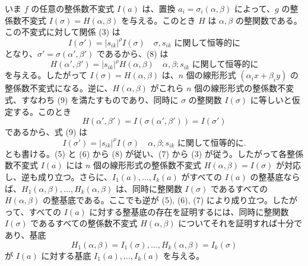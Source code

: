 \documentclass[11pt]{article}
\begin{document}
いま \(f\) の任意の整係数不変式 \(I(a)\) は、置換 \(a_i=\sigma_i(\alpha,\beta)\) によって、\(g\) の整係数不変式 \(I(\sigma)=H(\alpha,\beta)\) を与える。このとき \(H\) は \(\alpha,\beta\) の整関数である。この不変式に対して関係 (3) は
\begin{equation}
        I(\sigma')=|s_{ik}|^\rho I(\sigma)
        \quad \text{\(\sigma,s_{ik}\) に関して恒等的に}
\end{equation}
となり、\(\sigma'=\sigma(\alpha',\beta')\) であるから、(8) は
\begin{equation}
        H(\alpha',\beta')=|s_{ik}|^\rho H(\alpha,\beta)
        \quad \text{\(\alpha,\beta;s_{ik}\) に関して恒等的に}
\end{equation}
を与える。したがって \(I(\sigma)=H(\alpha,\beta)\) は、\(n\) 個の線形形式 \((\alpha_i x+\beta_i y)\) の整係数不変式になる。逆に、\(H(\alpha,\beta)\) がこれら \(n\) 個の線形形式の整係数不変式、すなわち (9) を満たすものであり、同時に \(\sigma\) の整関数 \(I(\sigma)\) に等しいと仮定する。このとき
\[
        H(\alpha',\beta')=I(\sigma(\alpha',\beta'))=I(\sigma')
\]
であるから、式 (9) は
\begin{equation*}
        I(\sigma')=|s_{ik}|^\rho I(\sigma)
        \quad \text{\(\alpha,\beta;s_{ik}\) に関して恒等的に}.\tag{9a}
\end{equation*}
とも書ける。(5) と (6) から (8) が従い、(7) から (3) が従う。したがって各整係数不変式 \(I(a)\) には \(n\) 個の線形形式の整係数不変式 \(H(\alpha,\beta)=I(\sigma)\) が対応し、逆も成り立つ。さらに、\(I_1(a),\ldots,I_k(a)\) がすべての \(I(a)\) の整基底ならば、\(H_1(\alpha,\beta),\ldots,H_k(\alpha,\beta)\) は、同時に整関数 \(I(\sigma)\) であるすべての \(H(\alpha,\beta)\) の整基底である。ここでも逆が (5), (6), (7) により成り立つ。したがって、すべての \(I(a)\) に対する整基底の存在を証明するには、同時に整関数 \(I(\sigma)\) であるすべての整係数不変式 \(H(\alpha,\beta)\) についてそれを証明すれば十分であり、基底
\[
        H_1(\alpha,\beta)=I_1(\sigma),\ldots,H_k(\alpha,\beta)=I_k(\sigma)
\]
が \(I(a)\) に対する基底 \(I_1(a),\ldots,I_k(a)\) を与える。
\end{document}
